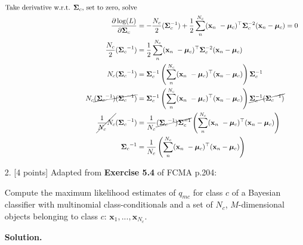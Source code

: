 \documentclass[10pt]{article}
\begin{document}
\begin{itemize}
\begin{eqnarray*}
\begin{aligned}
%
%
\text{Take derivative w.r.t. $\boldsymbol {\Sigma}_c$, set to zero, solve}
\\
\frac{\partial \log(L)}{\partial \boldsymbol {\Sigma}_c} 
&=
- \frac{N_c}{2} ( \boldsymbol {\Sigma}_c ^{-1} )
+ \frac{1}{2} 
\sum_n^{N_c} (\mathbf{x}_n\ - \boldsymbol {\mu}_c)^\top \boldsymbol {\Sigma}_c^{-2} (\mathbf{x}_n - \boldsymbol {\mu}_c) = 0
\\
\frac{N_c}{2} ({ \boldsymbol {\Sigma}_c }^{-1}) &=
\frac{1}{2} 
\sum_n^{N_c} (\mathbf{x}_n\ - \boldsymbol {\mu}_c)^\top \boldsymbol {\Sigma}_c^{-2} (\mathbf{x}_n - \boldsymbol {\mu}_c)
\\
N_c ({ \boldsymbol {\Sigma}_c }^{-1}) &= 
\boldsymbol {\Sigma}_c^{-1} \left(
\sum_n^{N_c} (\mathbf{x}_n\ - \boldsymbol {\mu}_c)^\top  (\mathbf{x}_n - \boldsymbol {\mu}_c) 
\right) \boldsymbol {\Sigma}_c^{-1}
\\
N_c \cancel{ ({ \boldsymbol {\Sigma}_c }^{-1}) ({ \boldsymbol {\Sigma}_c }^{-1}) } &= 
\boldsymbol {\Sigma}_c^{-1} \left(
\sum_n^{N_c} (\mathbf{x}_n\ - \boldsymbol {\mu}_c)^\top  (\mathbf{x}_n - \boldsymbol {\mu}_c) 
\right)
\cancel{ \boldsymbol {\Sigma}_c^{-1} ({ \boldsymbol {\Sigma}_c }^{-1}) }
\\
\cancel{ \frac{1}{N_c} N_c } ({ \boldsymbol {\Sigma}_c }^{-1}) &= 
\frac{1}{N_c}
\cancel{ ({ \boldsymbol {\Sigma}_c }^{-1}) \boldsymbol {\Sigma}_c^{-1} }
\left( \sum_n^{N_c} (\mathbf{x}_n\ - \boldsymbol {\mu}_c)^\top  (\mathbf{x}_n - \boldsymbol {\mu}_c) \right) 
\\
{ \boldsymbol {\Sigma}_c }^{-1} &= 
\frac{1}{N_c} \left( \sum_n^{N_c} (\mathbf{x}_n\ - \boldsymbol {\mu}_c)^\top  (\mathbf{x}_n - \boldsymbol {\mu}_c) \right) 
\end{aligned}
\end{eqnarray*}

\item[2.]  [4 points]
Adapted from {\bf Exercise 5.4} of FCMA p.204:

Compute the maximum likelihood estimates of $q_{mc}$ for class $c$ of a Bayesian classifier with multinomial class-conditionals and a set of $N_c$, $M$-dimensional objects belonging to class $c$: $\mathbf{x}_1, ..., \mathbf{x}_{N_c}$.

{\bf Solution.} %


\end{itemize}
\end{document}
